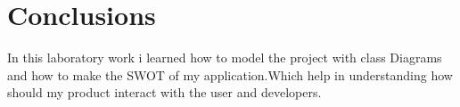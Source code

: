 \section*{Conclusions}
In this laboratory work i learned how to model the project with class Diagrams and how to make the SWOT of my application.Which help in understanding how should my product interact with the user and developers.
\clearpage